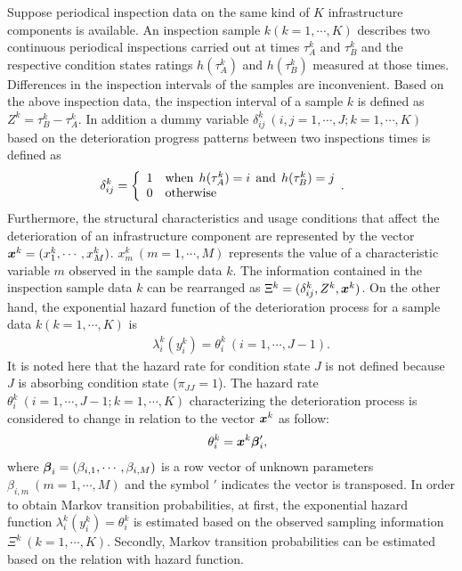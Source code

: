 Suppose periodical inspection data on the same kind of $K$ infrastructure components is available. An inspection sample $k(k= 1, \cdots, K) $ describes two continuous periodical inspections carried out at times $\tau_A^k$ and $\tau_B^k$ and the respective condition states ratings $h(\tau_A^k)$ and $h(\tau_B^k)$ measured at those times. Differences in the inspection intervals of the samples are inconvenient. Based on the above inspection data, the inspection interval of a sample $k$ is defined as $Z^k=\tau_B^k-\tau_A^k$. In addition a dummy variable $\delta_{ij}^k~(i,j=1,\cdots,J; k=1,\cdots,K)$ based on the deterioration progress patterns between two inspections times is defined as
\begin{eqnarray}
&& \hspace{-8mm} \delta_{ij}^k=\left\{
\begin{array}{ll}
1 & \mbox{when} \;\,h(\tau_A^k)=i \;\,\mbox{and}\;\, h(\tau_B^k)=j\\
0 & \mbox{otherwise}
\end{array}.
\right.
\end{eqnarray}
Furthermore, the structural characteristics and usage conditions that affect the deterioration of an infrastructure component are represented by the vector $\mbox{\boldmath$x$}^k=(x_1^k,\cdots,x_M^k)$. $x_m^k~(m=1,\cdots,M)$ represents the value of a characteristic variable $m$ observed in the sample data $k$. The information contained in the inspection sample data $k$ can be rearranged as $\Xi^k=(\delta_ {ij} ^k, Z^k, \mbox{\boldmath$x$}^k) $. On the other hand, the exponential hazard function of the deterioration process for a sample data $k(k= 1, \cdots, K) $ is 
\begin{eqnarray}
&& \lambda_i^k(y_i^k)=\theta_i^k ~(i=1,\cdots,J-1). \nonumber
\end{eqnarray}
It is noted here that the hazard rate for condition state $J$ is not defined because $J$ is absorbing condition state ($\pi_{JJ} =1$). The hazard rate $\theta_i^k~(i=1,\cdots,J-1;k=1,\cdots,K)$ characterizing the deterioration process is considered to change in relation to the vector $\mbox{\boldmath$x$}^k$ as follow: 
\begin{eqnarray}
&& \theta_i^k=\mbox{\boldmath$x$}^k\mbox{\boldmath$\beta$}_i^\prime ,\label{hazard1}
\end{eqnarray}
where $\mbox{\boldmath$\beta$}_i=(\beta_{i,1},\cdots,\beta_{i,M})$ is a row vector of unknown parameters $\beta_{i,m}~(m=1,\cdots,M)$ and the symbol $\prime$ indicates the vector is transposed. In order to obtain Markov transition probabilities, at first, the exponential hazard function $\lambda_i^k(y_i^k)=\theta_i^k$ is estimated based on the observed sampling information $\Xi^k~(k=1,\cdots,K)$. Secondly, Markov transition probabilities can be estimated based on the relation with hazard function. 

